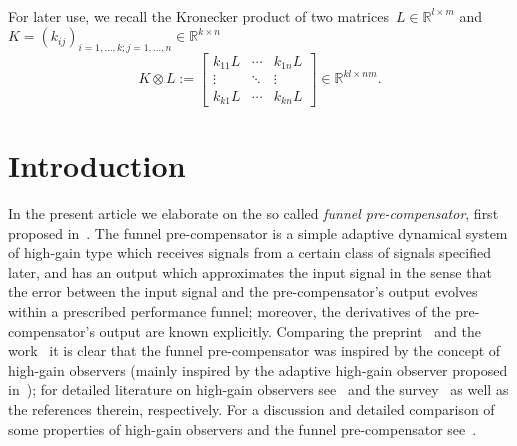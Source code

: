 \documentclass[ envcountsect, envcountsame]{svjour3}
\newcommand{\R}{\mathbb{R}}
\begin{document}
%
\ \\
For later use, we recall the Kronecker product of two matrices~$L \in \R^{l \times m}$ and $K = \left( k_{ij} \right)_{i=1,\ldots,k;j=1,\ldots,n } \in \R^{k \times n}$ 
\begin{equation*}
K \otimes L := \begin{bmatrix} k_{11} L & \cdots & k_{1n} L \\ \vdots & \ddots & \vdots \\ k_{k1} L & \cdots & k_{kn} L\end{bmatrix} \in \R^{kl \times nm}.
\end{equation*}

\section{Introduction}
In the present article we elaborate on the so called \textit{funnel pre-compensator}, first proposed in~\cite{BergReis18b}.
The funnel pre-compensator is a simple adaptive dynamical system of high-gain type which receives signals from a certain class of signals specified later, and has an output which approximates the input signal in the sense that the error between the input signal and the pre-compensator's output evolves within a prescribed performance funnel; 
moreover, the derivatives of the pre-compensator's output are known explicitly.
%
Comparing the preprint~\cite{BergReis16app} and the work~\cite{BergReis18b} it is clear that the funnel pre-compensator was inspired by the concept of high-gain observers (mainly inspired by the adaptive high-gain observer proposed in~\cite{BullIlch98}); for detailed literature on high-gain observers see~\cite{EsfaKhal87,KhalSabe87,SabeSann90,Torn88} and the survey~\cite{KhalPral14} as well as the references therein, respectively.
For a discussion and detailed comparison of some properties of high-gain observers and the funnel pre-compensator see~\cite{BergReis18b}. 
\end{document}
